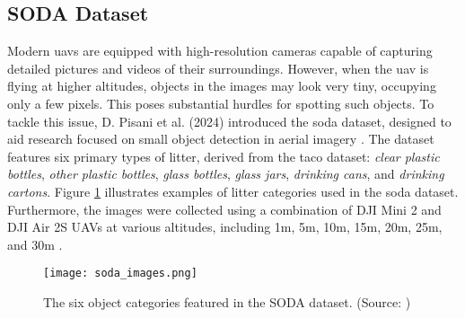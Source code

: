 \subsection{SODA Dataset}
\label{subsec:3_sodadataset}

Modern \gls{uav}s are equipped with high-resolution cameras capable of capturing detailed pictures and videos of their surroundings. However, when the \gls{uav} is flying at higher altitudes, objects in the images may look very tiny, occupying only a few pixels. This poses substantial hurdles for spotting such objects. To tackle this issue, D. Pisani et al. (2024) introduced the \gls{soda} dataset, designed to aid research focused on small object detection in aerial imagery \cite{soda_dataset}. The dataset features six primary types of litter, derived from the \gls{taco} dataset: \textit{clear plastic bottles}, \textit{other plastic bottles}, \textit{glass bottles}, \textit{glass jars}, \textit{drinking cans}, and \textit{drinking cartons}. Figure \ref{fig:soda1} illustrates examples of litter categories used in the \gls{soda} dataset. Furthermore, the images were collected using a combination of DJI Mini 2 and DJI Air 2S UAVs at various altitudes, including 1m, 5m, 10m, 15m, 20m, 25m, and 30m \cite{soda_dataset, detect_litter}.

\begin{figure}[!htbp]
    \centering
    \texttt{[image: soda\_images.png]}
    \caption{The six object categories featured in the SODA dataset. (Source: \cite{soda_dataset})}
    \label{fig:soda1}
\end{figure}

